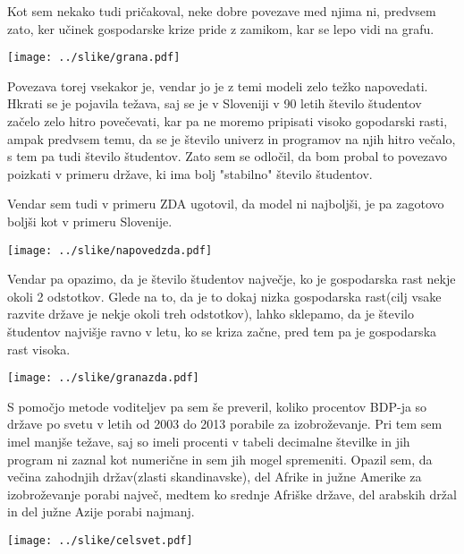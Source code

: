 \documentclass[11pt,a4paper]{article}
\begin{document}
Kot sem nekako tudi pričakoval, neke dobre povezave med njima ni, predvsem zato, ker učinek gospodarske krize pride z zamikom, kar se lepo vidi na grafu.

\texttt{[image: ../slike/grana.pdf]}

Povezava torej vsekakor je, vendar jo je z temi modeli zelo težko napovedati. Hkrati se je pojavila težava, saj se je v Sloveniji v 90 letih število študentov začelo zelo hitro povečevati, kar pa ne moremo pripisati visoko gopodarski rasti, ampak predvsem temu, da se je število univerz in programov na njih hitro večalo, s tem pa tudi število študentov. Zato sem se odločil, da bom probal to povezavo poizkati v primeru države, ki ima bolj "stabilno" število študentov. 

Vendar sem tudi v primeru ZDA ugotovil, da model ni najboljši, je pa zagotovo boljši kot v primeru Slovenije. 

\texttt{[image: ../slike/napovedzda.pdf]}

Vendar pa opazimo, da je število študentov največje, ko je gospodarska rast nekje okoli 2 odstotkov. Glede na to, da je to dokaj nizka gospodarska rast(cilj vsake razvite države je nekje okoli treh odstotkov), lahko sklepamo, da je število študentov najvišje ravno v letu, ko se kriza začne, pred tem pa je gospodarska rast visoka. 

\texttt{[image: ../slike/granazda.pdf]}

S pomočjo metode voditeljev pa sem še preveril, koliko procentov BDP-ja so države po svetu v letih od 2003 do 2013 porabile za izobroževanje. Pri tem sem imel manjše težave, saj so imeli procenti v tabeli decimalne številke in jih program ni zaznal kot numerične in sem jih mogel spremeniti. Opazil sem, da večina zahodnjih držav(zlasti skandinavske), del Afrike in južne Amerike za izobroževanje porabi največ, medtem ko srednje Afriške države, del arabskih držal in del južne Azije porabi najmanj.

\texttt{[image: ../slike/celsvet.pdf]}
\end{document}

